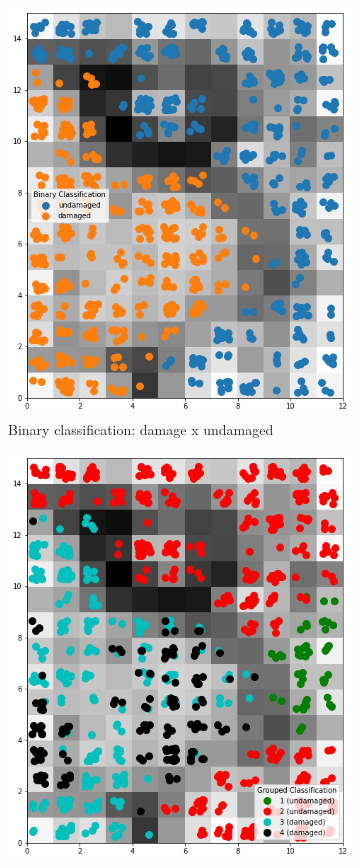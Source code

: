 \documentclass[twocolumn]{article}
\begin{document}
\begin{figure}
\begin{subfigure}{0.45\textwidth}
            \includegraphics[width=\textwidth]{som_2.png}
            \caption{Binary classification: damage x undamaged}
            \label{fig:som2}
      \end{subfigure}
      \begin{subfigure}{0.45\textwidth}
            \centering
            \includegraphics[width=\textwidth]{som_4.png}

\end{subfigure}
\end{figure}
\end{document}
